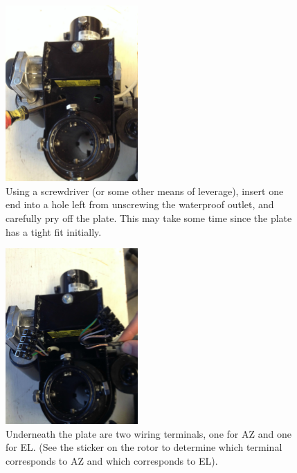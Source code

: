 \documentclass[11pt]{article} %
\begin{document}
\begin{figure}
  \centering
  \caption{Using a screwdriver (or some other means of leverage), insert one end into a hole left from unscrewing the waterproof outlet, and carefully pry off the plate. This may take some time since the plate has a tight fit initially.}
  \includegraphics[width=0.45\textwidth]{wiring/04.jpeg}
\end{figure}


\begin{figure}
  \centering
  \caption{Underneath the plate are two wiring terminals, one for AZ and one for EL. (See the sticker on the rotor to determine which terminal corresponds to AZ and which corresponds to EL).}
  \includegraphics[width=0.45\textwidth]{wiring/05.jpeg}
\end{figure}
\end{document}
